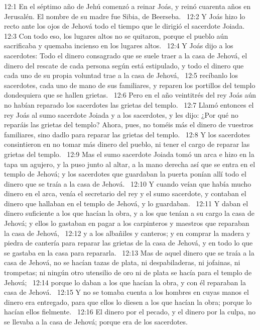 12:1 En el séptimo año de Jehú comenzó a reinar Joás, y reinó cuarenta años en Jerusalén. El nombre de su madre fue Sibia, de Beerseba.  
12:2 Y Joás hizo lo recto ante los ojos de Jehová todo el tiempo que le dirigió el sacerdote Joiada.  
12:3 Con todo eso, los lugares altos no se quitaron, porque el pueblo aún sacrificaba y quemaba incienso en los lugares altos.  
12:4 Y Joás dijo a los sacerdotes: Todo el dinero consagrado que se suele traer a la casa de Jehová, el dinero del rescate de cada persona según está estipulado, y todo el dinero que cada uno de su propia voluntad trae a la casa de Jehová,  
12:5 recíbanlo los sacerdotes, cada uno de mano de sus familiares, y reparen los portillos del templo dondequiera que se hallen grietas.  
12:6 Pero en el año veintitrés del rey Joás aún no habían reparado los sacerdotes las grietas del templo.  
12:7 Llamó entonces el rey Joás al sumo sacerdote Joiada y a los sacerdotes, y les dijo: ¿Por qué no reparáis las grietas del templo? Ahora, pues, no toméis más el dinero de vuestros familiares, sino dadlo para reparar las grietas del templo.  
12:8 Y los sacerdotes consintieron en no tomar más dinero del pueblo, ni tener el cargo de reparar las grietas del templo.  
12:9 Mas el sumo sacerdote Joiada tomó un arca e hizo en la tapa un agujero, y la puso junto al altar, a la mano derecha así que se entra en el templo de Jehová; y los sacerdotes que guardaban la puerta ponían allí todo el dinero que se traía a la casa de Jehová.  
12:10 Y cuando veían que había mucho dinero en el arca, venía el secretario del rey y el sumo sacerdote, y contaban el dinero que hallaban en el templo de Jehová, y lo guardaban.  
12:11 Y daban el dinero suficiente a los que hacían la obra, y a los que tenían a su cargo la casa de Jehová; y ellos lo gastaban en pagar a los carpinteros y maestros que reparaban la casa de Jehová,  
12:12 y a los albañiles y canteros; y en comprar la madera y piedra de cantería para reparar las grietas de la casa de Jehová, y en todo lo que se gastaba en la casa para repararla.  
12:13 Mas de aquel dinero que se traía a la casa de Jehová, no se hacían tazas de plata, ni despabiladeras, ni jofainas, ni trompetas; ni ningún otro utensilio de oro ni de plata se hacía para el templo de Jehová;  
12:14 porque lo daban a los que hacían la obra, y con él reparaban la casa de Jehová.  
12:15 Y no se tomaba cuenta a los hombres en cuyas manos el dinero era entregado, para que ellos lo diesen a los que hacían la obra; porque lo hacían ellos fielmente.  
12:16 El dinero por el pecado, y el dinero por la culpa, no se llevaba a la casa de Jehová; porque era de los sacerdotes. 
